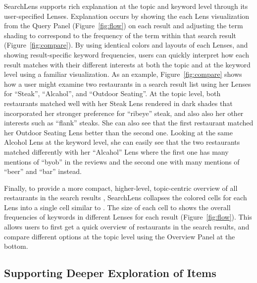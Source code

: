 \documentclass{sigchi}
\begin{document}
SearchLens supports rich explanation at the topic and keyword level through its user-specified Lenses. Explanation occurs by showing the each Lens visualization from the Query Panel (Figure~\ref{fig:flow}) on each result and adjusting the term shading to correspond to the frequency of the term within that search result (Figure~\ref{fig:compare}). By using identical colors and layouts of each Lenses, and showing result-specific keyword frequencies, users can quickly interpret how each result matches with their different interests at both the topic and at the keyword level using a familiar visualization. As an example, Figure~\ref{fig:compare} shows how a user might examine two restaurants in a search result list using her Lenses for ``Steak'', ``Alcahol'', and ``Outdoor Seating''. At the topic level, both restaurants matched well with her Steak Lens rendered in dark shades that incorporated her stronger preference for ``ribeye'' steak, and also also her other interests such as ``flank'' steaks. She can also see that the first restaurant matched her Outdoor Seating Lens better than the second one. Looking at the same Alcohol Lens at the keyword level, she can easily see that the two restaurants matched differently with her ``Alcahol'' Lens where the first one has many mentions of ``byob'' in the reviews and the second one with many mentions of ``beer'' and ``bar'' instead.


Finally, to provide a more compact, higher-level, topic-centric overview of all restaurants in the search results , SearchLens collapses the colored cells for each Lens into a single cell similar to \cite{hoeber2006comparative}. The size of each cell to shows the overall frequencies of keywords in different Lenses for each result (Figure~\ref{fig:flow}). This allows users to first get a quick overview of restaurants in the search results, and compare different options at the topic level using the Overview Panel at the bottom.


\subsection{Supporting Deeper Exploration of Items}
 
\end{document}
